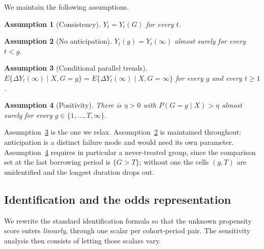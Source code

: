 \documentclass[12pt]{article}
\newtheorem{assumption}{Assumption}
\theoremstyle{remark}
\begin{document}
We maintain the following assumptions.

\begin{assumption}[Consistency]
\label{ass:cons}
$Y_t = Y_t(G)$ for every $t$.
\end{assumption}

\begin{assumption}[No anticipation]
\label{ass:na}
$Y_t(g) = Y_t(\infty)$ almost surely for every $t < g$.
\end{assumption}

\begin{assumption}[Conditional parallel trends]
\label{ass:pt}
$E\{\Delta Y_t(\infty) \mid X, G = g\} = E\{\Delta Y_t(\infty) \mid X, G = \infty\}$
for every $g$ and every $t \ge 1$.
\end{assumption}

\begin{assumption}[Positivity]
\label{ass:pos}
There is $\eta > 0$ with $P(G = g \mid X) > \eta$ almost surely for every
$g \in \{1, \ldots, T, \infty\}$.
\end{assumption}

Assumption~\ref{ass:pt} is the one we relax. Assumption~\ref{ass:na} is maintained
throughout: anticipation is a distinct failure mode and would need its own parameter.
Assumption~\ref{ass:pos} requires in particular a never-treated group, since the
comparison set at the last borrowing period is $\{G > T\}$; without one the cells $(g,T)$
are unidentified and the longest duration drops out.

\subsection{Identification and the odds representation}
\label{sec:odds}

We rewrite the standard identification formula so that the unknown propensity score enters
\emph{linearly}, through one scalar per cohort-period pair. The sensitivity analysis then
consists of letting those scalars vary.
\end{document}
